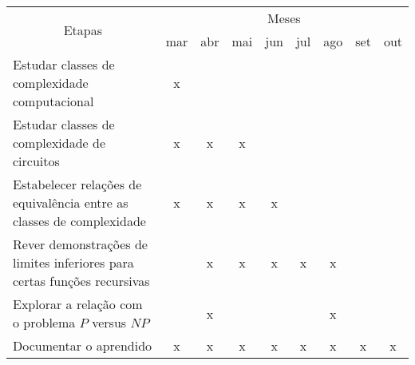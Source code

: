 \documentclass[12pt]{letter}
\begin{document}
\begin{tabularx}{\linewidth}{|X|*{8}{c|}}
    \hline
    \multicolumn{1}{|c|}{\multirow{2}{*}{Etapas}} & \multicolumn{8}{|c|}{Meses}\\ \cline{2-9}
    & mar & abr & mai & jun & jul & ago & set & out \\ \hline

    Estudar classes de complexidade computacional
    &  x  &     &     &     &     &     &     &     \\ \hline

    Estudar classes de complexidade de circuitos
    &  x  &  x  &  x  &     &     &     &     &     \\ \hline

    Estabelecer relações de equivalência entre as classes de complexidade
    &  x  &  x  &  x  &  x  &     &     &     &     \\ \hline

    Rever demonstrações de limites inferiores para \mbox{certas} funções recursivas
    &     &  x  &  x  &  x  &  x  &  x  &     &     \\ \hline

    Explorar a relação com o problema $P$ versus $NP$
    &     &  x  &     &     &     &  x  &     &     \\ \hline

    Documentar o aprendido
    &  x  &  x  &  x  &  x  &  x  &  x  &  x  &  x  \\ \hline

\end{tabularx}

\begin{centering}


\end{centering}
\end{document}
